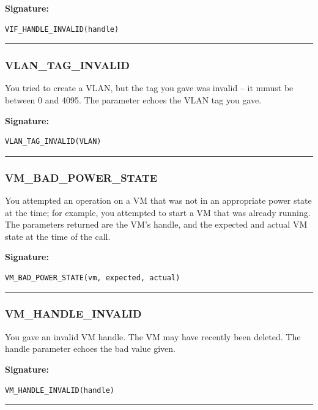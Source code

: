 \vspace{0.3cm}
{\bf Signature:}
\begin{verbatim}VIF_HANDLE_INVALID(handle)\end{verbatim}
\begin{center}\rule{10em}{0.1pt}\end{center}

\subsubsection{VLAN\_TAG\_INVALID}

You tried to create a VLAN, but the tag you gave was invalid -- it mmust be
between 0 and 4095.  The parameter echoes the VLAN tag you gave.

\vspace{0.3cm}
{\bf Signature:}
\begin{verbatim}VLAN_TAG_INVALID(VLAN)\end{verbatim}
\begin{center}\rule{10em}{0.1pt}\end{center}

\subsubsection{VM\_BAD\_POWER\_STATE}

You attempted an operation on a VM that was not in an appropriate power
state at the time; for example, you attempted to start a VM that was
already running.  The parameters returned are the VM's handle, and the
expected and actual VM state at the time of the call.

\vspace{0.3cm}
{\bf Signature:}
\begin{verbatim}VM_BAD_POWER_STATE(vm, expected, actual)\end{verbatim}
\begin{center}\rule{10em}{0.1pt}\end{center}

\subsubsection{VM\_HANDLE\_INVALID}

You gave an invalid VM handle.  The VM may have recently been deleted.  The
handle parameter echoes the bad value given.

\vspace{0.3cm}
{\bf Signature:}
\begin{verbatim}VM_HANDLE_INVALID(handle)\end{verbatim}
\begin{center}\rule{10em}{0.1pt}\end{center}

